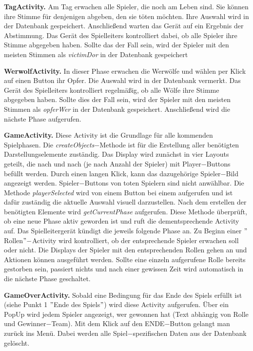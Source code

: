 \documentclass[12pt, a4paper]{article}
\begin{document}
\textbf{TagActivity.}
Am Tag erwachen alle Spieler, die noch am Leben sind. 
Sie können ihre Stimme für denjenigen abgeben, den sie töten möchten. Ihre Auswahl wird in der Datenbank
gespeichert. Anschließend warten das Gerät auf ein Ergebnis der Abstimmung.
Das Gerät des Spielleiters kontrolliert dabei, ob alle Spieler ihre Stimme abgegeben haben.
Sollte das der Fall sein, wird der Spieler mit den meisten Stimmen als \textit{victimDor} in der Datenbank
gespeichert      

\vspace{0,3 cm}

\textbf{WerwolfActivity.}
In dieser Phase erwachen die Werwölfe und wählen per Klick auf einen Button ihr Opfer.
Die Auswahl wird in der Datenbank vermerkt. Das Gerät des Spielleiters kontrolliert regelmäßig,
ob alle Wölfe ihre Stimme abgegeben haben. Sollte dies der Fall sein, wird der Spieler mit den meisten
Stimmen als \textit{opferWer} in der Datenbank gespeichert.
Anschließend wird die nächste Phase aufgerufen.

\vspace{0,3 cm}

\textbf{GameActivity.}
Diese Activity ist die Grundlage für alle kommenden Spielphasen. Die \textit{createObjects}$-$Methode ist für die Erstellung aller benötigten Darstellungselemente zuständig. Das Display wird zunächst in vier Layouts geteilt, die nach und nach (je nach Anzahl der Spieler) mit Player$-$Buttons befüllt werden. Durch einen langen Klick, kann das dazugehörige Spieler$-$Bild angezeigt werden. Spieler$-$Buttons von toten Spielern sind nicht anwählbar.
Die Methode \textit{playerSelected} wird von einem Button bei einem aufgerufen und ist dafür zuständig die aktuelle Auswahl visuell darzustellen.
Nach dem erstellen der benötigten Elemente wird \textit{getCurrentPhase} aufgerufen. Diese Methode überprüft, ob eine neue Phase aktiv geworden ist und ruft die dementsprechende Activity auf. Das Spielleitergerät kündigt die jeweils folgende Phase an.
Zu Beginn einer $"$Rollen$"-$Activity wird kontrolliert, ob der entsprechende Spieler erwachen soll oder nicht. Die Displays der Spieler mit den entsprechenden Rollen gehen an und Aktionen können ausgeführt werden.
Sollte eine einzeln aufgerufene Rolle bereits gestorben sein, passiert nichts und nach einer
gewissen Zeit wird automatisch in die nächste Phase geschaltet.

\vspace{0,3 cm}
            
\textbf{GameOverActivity.}
Sobald eine Bedingung für das Ende des Spiels erfüllt ist (siehe Punkt 1 $"$Ende des Spiels$"$) wird diese Activity aufgerufen.
Über ein PopUp wird jedem Spieler angezeigt, wer gewonnen hat (Text abhängig von Rolle und Gewinner$-$Team).
Mit dem Klick auf den ENDE$-$Button gelangt man zurück ins Menü. Dabei werden alle Spiel$-$spezifischen Daten aus der Datenbank gelöscht.
\end{document}
